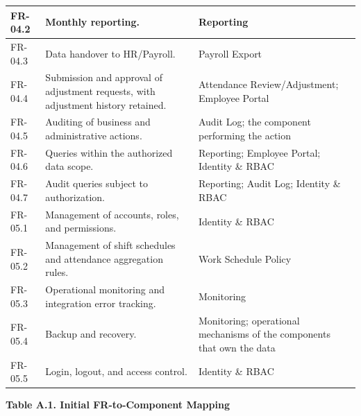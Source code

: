 \begin{longtable}{|>{\raggedright\arraybackslash}p{40.5pt}|>{\raggedright\arraybackslash}p{177.5pt}|>{\raggedright\arraybackslash}p{193.5pt}|}
FR-04.2 & Monthly reporting. & Reporting \\
\hline
FR-04.3 & Data handover to HR/Payroll. & Payroll Export \\
\hline
FR-04.4 & Submission and approval of adjustment requests, with adjustment history retained. & Attendance Review/Adjustment; Employee Portal \\
\hline
FR-04.5 & Auditing of business and administrative actions. & Audit Log; the component performing the action \\
\hline
FR-04.6 & Queries within the authorized data scope. & Reporting; Employee Portal; Identity \& RBAC \\
\hline
FR-04.7 & Audit queries subject to authorization. & Reporting; Audit Log; Identity \& RBAC \\
\hline
FR-05.1 & Management of accounts, roles, and permissions. & Identity \& RBAC \\
\hline
FR-05.2 & Management of shift schedules and attendance aggregation rules. & Work Schedule Policy \\
\hline
FR-05.3 & Operational monitoring and integration error tracking. & Monitoring \\
\hline
FR-05.4 & Backup and recovery. & Monitoring; operational mechanisms of the components that own the data \\
\hline
FR-05.5 & Login, logout, and access control. & Identity \& RBAC \\
\hline
\end{longtable}

\begin{center}

\textbf{Table A.1. Initial FR-to-Component Mapping}

\end{center}
